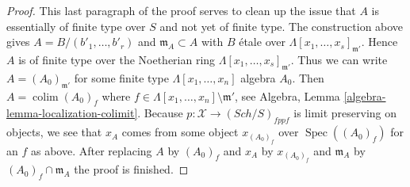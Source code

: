 \documentclass[10pt,a4paper]{amsart}
\theoremstyle{plain}
\theoremstyle{definition}
\theoremstyle{remark}
\numberwithin{equation}{subsection}
\def\colim{\mathop{\mathrm{colim}}\nolimits}
\def\Spec{\mathop{\mathrm{Spec}}}
\def\Sch{\mathit{Sch}}
\begin{document}
\begin{proof}
\medskip\noindent
This last paragraph of the proof serves to clean up the issue that $A$ is
essentially of finite type over $S$ and not yet of finite type.
The construction above gives $A = B/(b'_1, \ldots, b'_r)$ and
$\mathfrak m_A \subset A$ with $B$ \'etale over
$\Lambda[x_1, \ldots, x_s]_{\mathfrak m'}$. Hence $A$ is of finite
type over the Noetherian ring $\Lambda[x_1, \ldots, x_s]_{\mathfrak m'}$.
Thus we can write $A = (A_0)_{\mathfrak m'}$ for some finite type
$\Lambda[x_1, \ldots, x_n]$ algebra $A_0$. Then
$A = \colim (A_0)_f$ where
$f \in \Lambda[x_1, \ldots, x_n] \setminus \mathfrak m'$, see
Algebra, Lemma \ref{algebra-lemma-localization-colimit}.
Because $p : \mathcal{X} \to (\Sch/S)_{fppf}$ is limit preserving on
objects, we see that
$x_A$ comes from some object $x_{(A_0)_f}$ over $\Spec((A_0)_f)$ for
an $f$ as above. After replacing $A$ by $(A_0)_f$ and $x_A$ by
$x_{(A_0)_f}$ and $\mathfrak m_A$ by $(A_0)_f \cap \mathfrak m_A$
the proof is finished.
\end{proof}



\end{document}
